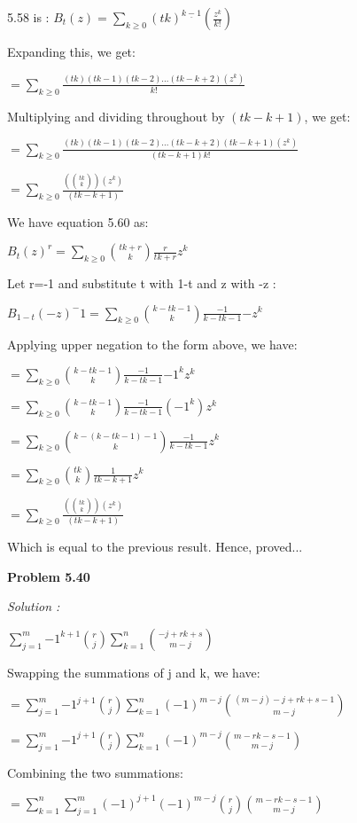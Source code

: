 \documentclass[12pt]{article}
\begin{document}
5.58 is : $B_t(z) = \sum_{k\geq 0}^{} (tk)^{\underline{k-1}}(\frac{z^k}{k!})$

Expanding this, we get:

$= \sum_{k\geq 0}^{}{\frac{(tk)(tk-1)(tk-2)...(tk-k+2)(z^k)}{k!}}$

Multiplying and dividing throughout by $(tk-k+1)$, we get:

$= \sum_{k\geq 0}^{}{\frac{(tk)(tk-1)(tk-2)...(tk-k+2)(tk-k+1)(z^k)}{(tk-k+1)k!}}$

$= \sum_{k\geq 0} \frac{(\binom{tk}{k})(z^k)}{(tk-k+1)}$

We have equation 5.60 as:

$B_t(z)^r = \sum_{k\geq 0} {\binom{tk+r}{k}}{\frac{r}{tk+r}}{z^k}$

Let r=-1 and substitute t with 1-t and z with -z :

$B_{1-t}(-z)^-1 = \sum_{k\geq 0} {\binom{k-tk-1}{k}}{\frac{-1}{k-tk-1}}{-z^k}$

Applying upper negation to the form above, we have:

$= \sum_{k\geq 0} {\binom{k-tk-1}{k}}{\frac{-1}{k-tk-1}}{-1^k}{z^k}$

$= \sum_{k\geq 0} {\binom{k-tk-1}{k}}{\frac{-1}{k-tk-1}}{(-1^k)}{z^k}$

$= \sum_{k\geq 0} {\binom{k-(k-tk-1)-1}{k}}{\frac{-1}{k-tk-1}}{z^k}$

$= \sum_{k\geq 0} {\binom{tk}{k}}{\frac{1}{tk-k+1}}{z^k}$

$= \sum_{k\geq 0} \frac{(\binom{tk}{k})(z^k)}{(tk-k+1)}$

Which is equal to the previous result. Hence, proved...

\medskip

\medskip

\noindent
{\bf Problem 5.40}

\textit {Solution :}

$\sum_{j=1}^{m} {-1^{k+1}}{\binom{r}{j}}{\sum_{k=1}^{n}\binom{-j+rk+s}{m-j}}$

Swapping the summations of j and k, we have:

$= \sum_{j=1}^{m} {-1^{j+1}}{\binom{r}{j}}{\sum_{k=1}^{n}(-1)^{m-j}\binom{(m-j)-j+rk+s-1}{m-j}}$

$= \sum_{j=1}^{m} {-1^{j+1}}{\binom{r}{j}}{\sum_{k=1}^{n}(-1)^{m-j}\binom{m-rk-s-1}{m-j}}$

Combining the two summations:

$= \sum_{k=1}^{n}\sum_{j=1}^{m} {(-1)^{j+1}}(-1)^{m-j}{\binom{r}{j}}{\binom{m-rk-s-1}{m-j}}$
\end{document}
